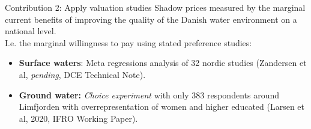 \begin{frame}{Contribution 2: Apply valuation studies}
  Shadow prices measured by the marginal current benefits of improving the quality of the Danish water environment on a national level.\\\bigskip
  I.e. the marginal willingness to pay using stated preference studies:
  \begin{itemize}
    \item \textbf{Surface waters}: Meta regressions analysis of 32 nordic studies (Zandersen et al, \textit{pending}, DCE Technical Note).
    \item \textbf{Ground water:} \textit{Choice experiment} with only 383 respondents around Limfjorden with overrepresentation of women and higher educated (Larsen et al, 2020, IFRO Working Paper).
  \end{itemize}
\end{frame}